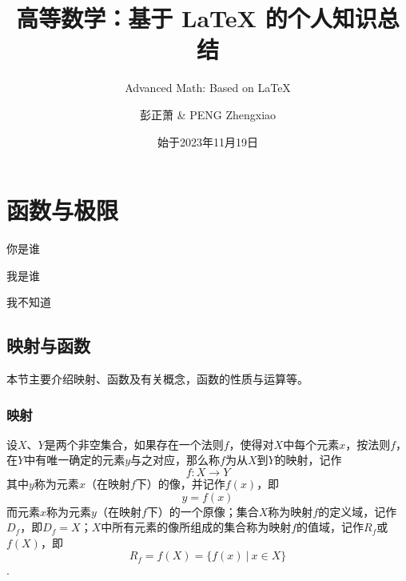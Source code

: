 \documentclass[lang=cn,10pt]{elegantbook}
\title{高等数学：基于 \LaTeX{} 的个人知识总结}
\subtitle{Advanced Math: Based on \LaTeX{}}
\author{彭正萧 \& PENG Zhengxiao}
\institute{西北农林科技大学}
\date{始于2023年11月19日}
\begin{document}
\maketitle
\frontmatter
\tableofcontents
\mainmatter



\chapter{函数与极限}
\begin{introduction}
	\item 你是谁
	\item 我是谁
	\item 我不知道
\end{introduction}
\section{映射与函数}

本节主要介绍映射、函数及有关概念，函数的性质与运算等。

\subsection{映射}

\begin{definition}
	设\(X\)、\( Y \)是两个非空集合，如果存在一个法则\( f \)，使得对\( X \)中每个元素\( x \)，按法则\( f \)，在\( Y \)中有唯一确定的元素\( y \)与之对应，那么称\( f \)为从\( X \)到\( Y \)的映射，记作
	\[ f:X \rightarrow Y \]
	其中\( y \)称为元素\( x \)（在映射\( f \)下）的像，并记作\( f(x) \)，即
	\[ y = f(x) \]
	而元素\( x \)称为元素\( y \)（在映射\( f \)下）的一个原像；集合\( X \)称为映射\( f \)的定义域，记作\( D_{f} \)，即\( D_{f} = X \)；\( X \)中所有元素的像所组成的集合称为映射\( f \)的值域，记作\( R_{f} \)或\( f(X) \)，即
	\[ R_{f} = f(X) = \{ f(x)\ |\ x \in X\}\].
\end{definition}
\end{document}
